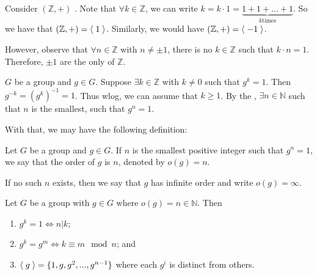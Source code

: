 \documentclass[notoc,notitlepage]{tufte-book}
\begin{document}
\begin{eg}
  Consider $(\mathbb{Z}, +)$ . Note that $\forall k \in \mathbb{Z}$, we can write $k = k \cdot 1 = \underbrace{1 + 1 + \hdots + 1}_{k \text{times}}$. So we have that $(\mathbb{Z} , +) = \langle \; 1 \; \rangle$. Similarly, we would have $(\mathbb{Z} , +) = \langle \; -1 \; \rangle$.

\noindent However, observe that $\forall n \in \mathbb{Z}$ with $n \neq \pm 1$, there is no $k \in \mathbb{Z} $ such that $k \cdot n = 1$. Therefore, $\pm 1$ are the only  of $\mathbb{Z}$.
\end{eg}

 $G$ be a group and $g \in G$. Suppose $\exists k \in \mathbb{Z}$ with $k \neq 0$ such that $g^k = 1$. Then $g^{-k} = ( g^k )^{-1} = 1$. Thus wlog, we can assume that $k \geq 1$. By the , $\exists n \in \mathbb{N}$ such that $n$ is the smallest, such that $g^n = 1$.

With that, we may have the following definition:

\begin{defn}
\label{defn:order_of_an_element}
  Let $G$ be a group and $g \in G$. If $n$ is the smallest positive integer such that $g^n = 1$, we say that the order of $g$ is $n$, denoted by $o(g) = n$.

  \noindent If no such $n$ exists, then we say that $g$ has infinite order and write $o(g) = \infty$.
\end{defn}

\begin{propo}
\label{propo:properties_of_elements_of_finite_order}
  Let $G$ be a group with $g \in G$ where $o(g) = n \in \mathbb{N}$. Then
  \begin{enumerate}
    \item $g^k = 1 \iff n | k$;
    \item $g^k = g^m \iff k \equiv m \mod n$; and
    \item $\langle \; g \; \rangle = \{1, g, g^2, ..., g^{n - 1} \}$ where each $g^i$ is distinct from others.
  \end{enumerate}
\end{propo}
\end{document}
